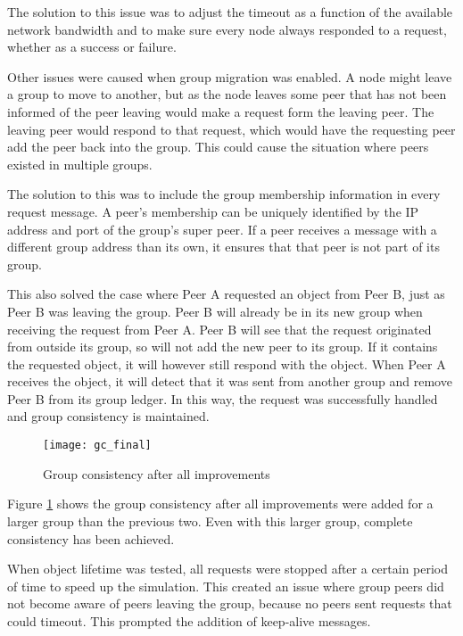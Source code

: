 The solution to this issue was to adjust the timeout as a function of the available network bandwidth and to make sure every node always responded to a request, whether as a success or failure.

Other issues were caused when group migration was enabled. A node might leave a group to move to another, but as the node leaves some peer that has not been informed of the peer leaving would make a request form the leaving peer. The leaving peer would respond to that request, which would have the requesting peer add the peer back into the group. This could cause the situation where peers existed in multiple groups.

The solution to this was to include the group membership information in every request message. A peer's membership can be uniquely identified by the IP address and port of the group's super peer. If a peer receives a message with a different group address than its own, it ensures that that peer is not part of its group.

This also solved the case where Peer A requested an object from Peer B, just as Peer B was leaving the group. Peer B will already be in its new group when receiving the request from Peer A. Peer B will see that the request originated from outside its group, so will not add the new peer to its group. If it contains the requested object, it will however still respond with the object. When Peer A receives the object, it will detect that it was sent from another group and remove Peer B from its group ledger. In this way, the request was successfully handled and group consistency is maintained.

\begin{figure}[htbp]
 \centering
 \texttt{[image: gc\_final]}
 \caption{Group consistency after all improvements}
 \label{fig_gc_final}
\end{figure}

Figure \ref{fig_gc_final} shows the group consistency after all improvements were added for a larger group than the previous two. Even with this larger group, complete consistency has been achieved.

When object lifetime was tested, all requests were stopped after a certain period of time to speed up the simulation. This created an issue where group peers did not become aware of peers leaving the group, because no peers sent requests that could timeout. This prompted the addition of keep-alive messages.

